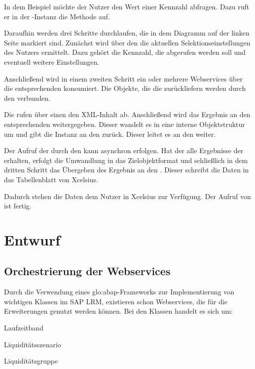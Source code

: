 \begin{onehalfspacing}
In dem Beispiel möchte der Nutzer den Wert einer Kennzahl abfragen. Dazu ruft er in der -Instanz die Methode  auf.

Daraufhin werden drei Schritte durchlaufen, die in dem Diagramm auf der linken Seite markiert sind. Zunächst wird über den  die aktuellen Selektionseinstellungen des Nutzers ermittelt. Dazu gehört die Kennzahl, die abgerufen werden soll und eventuell weitere Einstellungen.

Anschließend wird in einem zweiten Schritt ein oder mehrere Webservices über die entsprechenden  konsumiert. Die Objekte, die die  zurückliefern werden durch den  verbunden.

Die  rufen über einen  den \gls{XML}-Inhalt ab. Anschließend wird das Ergebnis an den entsprechenden  weitergegeben. Dieser wandelt es in eine interne Objektstruktur um und gibt die Instanz an den  zurück. Dieser leitet es an den  weiter.

Der Aufruf der  durch den  kann asynchron erfolgen. Hat der  alle Ergebnisse der  erhalten, erfolgt die Umwandlung in das Zielobjektformat und schließlich in dem dritten Schritt das Übergeben des Ergebnis an den . Dieser schreibt die Daten in das Tabellenblatt von \gls{Xcelsius}.

Dadurch stehen die Daten dem Nutzer in \gls{Xcelsius} zur Verfügung. Der Aufruf von  ist fertig.

\section{Entwurf}

\subsection{Orchestrierung der Webservices}
Durch die Verwendung eines \gls{glo:abap}-Frameworks zur Implementierung von wichtigen Klassen im SAP LRM, existieren schon Webservices, die für die Erweiterungen genutzt werden können. Bei den Klassen handelt es sich um:

\begin{seList}
\item Laufzeitband
\item Liquiditätsszenario
\item Liquiditätsgruppe
\end{seList}


\end{onehalfspacing}
